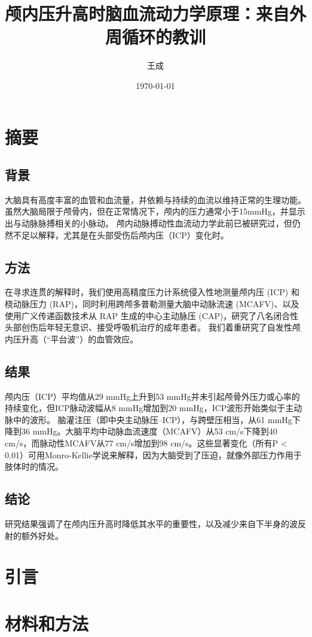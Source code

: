 \documentclass[12pt]{article}
\title{颅内压升高时脑血流动力学原理：来自外周循环的教训}
\author{王成}
\date{\today}
\begin{document}
\maketitle
\newpage

\tableofcontents
\newpage

\section{摘要}
\subsection{背景}
大脑具有高度丰富的血管和血流量，并依赖与持续的血流以维持正常的生理功能。
虽然大脑局限于颅骨内，但在正常情况下，颅内的压力通常小于15mmHg，并显示出与动脉脉搏相关的小脉动。
颅内动脉搏动性血流动力学此前已被研究过，但仍然不足以解释，尤其是在头部受伤后颅内压（ICP）变化时。

\subsection{方法}
在寻求连贯的解释时，我们使用高精度压力计系统侵入性地测量颅内压 (ICP) 和桡动脉压力 (RAP)，同时利用跨颅多普勒测量大脑中动脉流速 (MCAFV)、以及使用广义传递函数技术从 R​​AP 生成的中心主动脉压 (CAP)，研究了八名闭合性头部创伤后年轻无意识、接受呼吸机治疗的成年患者。
我们着重研究了自发性颅内压升高（“平台波”）的血管效应。

\subsection{结果}
颅内压（ICP）平均值从29 mmHg上升到53 mmHg并未引起颅骨外压力或心率的持续变化，但ICP脉动波幅从8 mmHg增加到20 mmHg，ICP波形开始类似于主动脉中的波形。
脑灌注压（即中央主动脉压–ICP），与跨壁压相当，从61 mmHg下降到36 mmHg。大脑平均中动脉血流速度（MCAFV）从53 cm/s下降到40 cm/s，而脉动性MCAFV从77 cm/s增加到98 cm/s。这些显著变化（所有P < 0.01）可用Monro-Kellie学说来解释，因为大脑受到了压迫，就像外部压力作用于肢体时的情况。

\subsection{结论}
研究结果强调了在颅内压升高时降低其水平的重要性，以及减少来自下半身的波反射的额外好处。

\section{引言}

\section{材料和方法}
\end{document}

